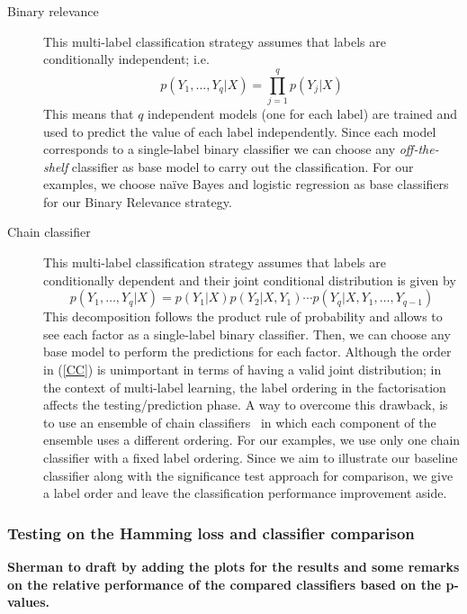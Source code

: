 \documentclass[review]{elsarticle}
\begin{document}
\begin{description}
	\item[Binary relevance] This multi-label classification strategy assumes that labels are conditionally independent; i.e.
	\begin{equation}
	p(Y_{1},\ldots,Y_{q}|X) = \prod^{q}_{j=1}{p(Y_{j}|X)}
	\end{equation}
	This means that $q$ independent models (one for each label) are trained and used to predict the value of each label independently. Since each model corresponds to a single-label binary classifier we can choose any \emph{off-the-shelf} classifier as base model to carry out the classification. For our examples, we choose na\"ive Bayes and logistic regression as base classifiers for our Binary Relevance strategy.
	\item[Chain classifier] This multi-label classification strategy assumes that labels are conditionally dependent and their joint conditional distribution is given by 
	\begin{equation}\label{CC}
	p(Y_{1},\ldots,Y_{q}|X) = p(Y_{1}|X)p(Y_{2}|X,Y_{1})\cdots p(Y_{q}|X,Y_{1},\ldots,Y_{q-1})
	\end{equation}
	This decomposition follows the product rule of probability and allows to see each factor as a single-label binary classifier. Then, we can choose any base model to perform the predictions for each factor. Although the order in (\ref{CC}) is unimportant in terms of having a valid joint distribution; in the context of multi-label learning, the label ordering in the factorisation affects the testing/prediction phase. A way to overcome this drawback, is to use an ensemble of chain classifiers~\citep{OCC,PCC} in which each component of the ensemble uses a different ordering. For our examples, we use only one chain classifier with a fixed label ordering. Since we aim to illustrate our baseline classifier along with the significance test approach for comparison, we give a label order and leave the classification performance improvement aside.
\end{description}

\subsubsection{Testing on the Hamming loss and classifier comparison}\label{sss:Hamming}

{\bf Sherman to draft by adding the plots for the results and some remarks on the relative performance of the compared classifiers based on the p-values.}
\end{document}
